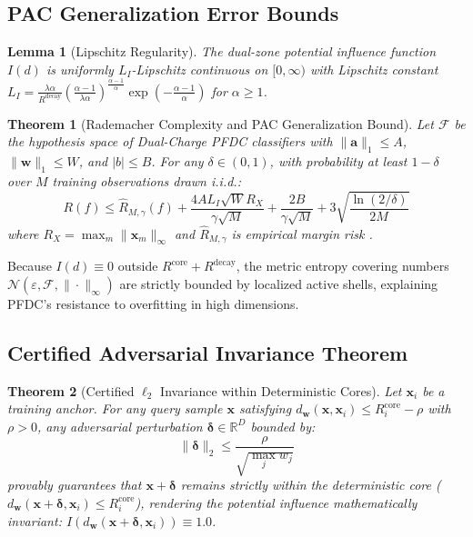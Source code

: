 \documentclass[11pt,a4paper]{article}
\newtheorem{theorem}{Theorem}
\newtheorem{lemma}{Lemma}
\begin{document}
\subsection{PAC Generalization Error Bounds}
\begin{lemma}[Lipschitz Regularity]
The dual-zone potential influence function $I(d)$ is uniformly $L_I$-Lipschitz continuous on $[0, \infty)$ with Lipschitz constant $L_I = \frac{\lambda \alpha}{R^{\mathrm{decay}}} (\frac{\alpha - 1}{\lambda \alpha})^{\frac{\alpha - 1}{\alpha}} \exp(-\frac{\alpha - 1}{\alpha})$ for $\alpha \ge 1$.
\end{lemma}

\begin{theorem}[Rademacher Complexity and PAC Generalization Bound]
\label{thm:rademacher}
Let $\mathcal{F}$ be the hypothesis space of Dual-Charge PFDC classifiers with $\|\mathbf{a}\|_1 \le A$, $\|\mathbf{w}\|_1 \le W$, and $|b| \le B$. For any $\delta \in (0, 1)$, with probability at least $1 - \delta$ over $M$ training observations drawn i.i.d.:
\begin{equation}
R(f) \le \hat{R}_{M,\gamma}(f) + \frac{4 A L_I \sqrt{W} R_X}{\gamma \sqrt{M}} + \frac{2 B}{\gamma \sqrt{M}} + 3 \sqrt{\frac{\ln(2/\delta)}{2M}}
\end{equation}
where $R_X = \max_m \|\mathbf{x}_m\|_\infty$ and $\hat{R}_{M,\gamma}$ is empirical margin risk \cite{bartlett2002rademacher}.
\end{theorem}
Because $I(d) \equiv 0$ outside $R^{\mathrm{core}} + R^{\mathrm{decay}}$, the metric entropy covering numbers $\mathcal{N}(\varepsilon, \mathcal{F}, \|\cdot\|_\infty)$ are strictly bounded by localized active shells, explaining PFDC's resistance to overfitting in high dimensions.

\subsection{Certified Adversarial Invariance Theorem}
\begin{theorem}[Certified $\ell_2$ Invariance within Deterministic Cores]
\label{thm:robustness}
Let $\mathbf{x}_i$ be a training anchor. For any query sample $\mathbf{x}$ satisfying $d_{\mathbf{w}}(\mathbf{x}, \mathbf{x}_i) \le R_i^{\mathrm{core}} - \rho$ with $\rho > 0$, any adversarial perturbation $\boldsymbol{\delta} \in \mathbb{R}^D$ bounded by:
\begin{equation}
\|\boldsymbol{\delta}\|_2 \le \frac{\rho}{\sqrt{\max_{j} w_j}}
\end{equation}
provably guarantees that $\mathbf{x} + \boldsymbol{\delta}$ remains strictly within the deterministic core ($d_{\mathbf{w}}(\mathbf{x} + \boldsymbol{\delta}, \mathbf{x}_i) \le R_i^{\mathrm{core}}$), rendering the potential influence mathematically invariant: $I(d_{\mathbf{w}}(\mathbf{x} + \boldsymbol{\delta}, \mathbf{x}_i)) \equiv 1.0$.
\end{theorem}
\end{document}
